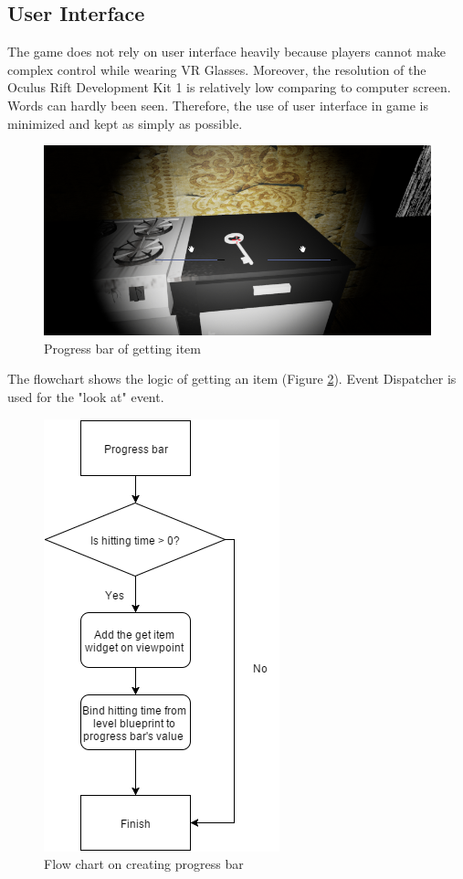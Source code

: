 \documentclass{article}
\begin{document}
\subsection{User Interface}
The game does not rely on user interface heavily because players cannot make complex control while wearing VR Glasses. Moreover, the resolution of the Oculus Rift Development Kit 1 is relatively low comparing to computer screen. Words can hardly been seen. Therefore, the use of user interface in game is minimized and kept as simply as possible.
\bigskip

\begin{figure}[h]
\centering
\includegraphics[scale=0.6]{ui1.png}
\caption{Progress bar of getting item}
\label{fig:ui1}
\end{figure}

\clearpage

The flowchart shows the logic of getting an item (Figure \ref{fig:ui2}). Event Dispatcher is used for the "look at" event.
\begin{figure}[h]
\centering
\includegraphics[scale=0.6]{ui2.png}
\caption{Flow chart on creating progress bar}
\label{fig:ui2}
\end{figure}
\end{document}
